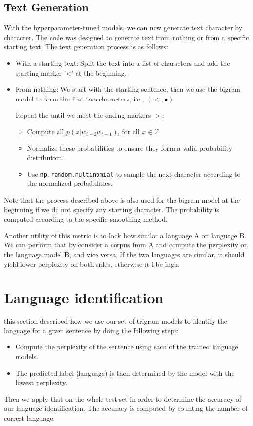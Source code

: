 \subsection{Text Generation}
With the hyperparameter-tuned models, we can now generate text character by character. The code was designed to generate text from nothing or from a specific starting text. The text generation process is as follows:
\begin{itemize}
\item With a starting text: Split the text into a list of characters and add the starting marker '<' at the beginning.
\item From nothing: We start with the starting sentence, then we use the bigram model to form the first two characters, i.e., $(<, \bullet)$.

Repeat the until we meet the ending markers $>$:
\begin{itemize}
\item Compute all $p(x|w_{t-2}w_{t-1})$, for all $x\in\mathcal{V}$
\item Normalize these probabilities to ensure they form a valid probability distribution.
\item Use \texttt{np.random.multinomial} to sample the next character according to the normalized probabilities.
\end{itemize}
\end{itemize}
Note that the process described above is also used for the bigram model at the beginning if we do not specify any starting character.
The probability is computed according to the specific smoothing method.


Another utility of this metric is to look how similar a language A on language B. We can perform that by consider a corpus from A and compute the perplexity on the language model B, and vice versa. If the two languages are similar, it should yield lower perplexity on both sides, otherwise it l be high.
\section{Language identification}
this section described how we use our set of trigram models to identify the language for a given sentence by doing the following steps:
\begin{itemize}
    \item Compute the perplexity of the sentence using each of the trained language models.
    \item The predicted label (language) is then determined by the model with the lowest perplexity.
\end{itemize}
Then we apply that on the whole test set in order to determine the accuracy of our language identification. The accuracy is computed by counting the number of correct language.
